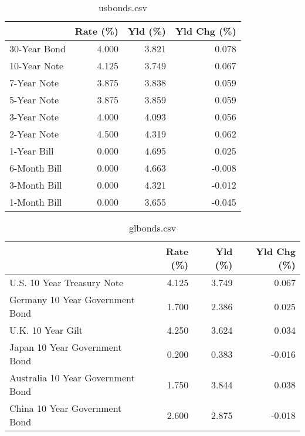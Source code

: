 \documentclass{article}%
\begin{document}
%


\begin{table}[htbp]%
\caption{usbonds.csv}%
\centering%
\begin{adjustbox}{width=1\textwidth}%
\begin{tabular}{lrrr}
\toprule
             &  Rate (\%) &  Yld (\%) &  Yld Chg (\%) \\
\midrule
30-Year Bond &     4.000 &    3.821 &        0.078 \\
10-Year Note &     4.125 &    3.749 &        0.067 \\
 7-Year Note &     3.875 &    3.838 &        0.059 \\
 5-Year Note &     3.875 &    3.859 &        0.059 \\
 3-Year Note &     4.000 &    4.093 &        0.056 \\
 2-Year Note &     4.500 &    4.319 &        0.062 \\
 1-Year Bill &     0.000 &    4.695 &        0.025 \\
6-Month Bill &     0.000 &    4.663 &       -0.008 \\
3-Month Bill &     0.000 &    4.321 &       -0.012 \\
1-Month Bill &     0.000 &    3.655 &       -0.045 \\
\bottomrule
\end{tabular}
%
\end{adjustbox}%
\end{table}

%


\begin{table}[htbp]%
\caption{glbonds.csv}%
\centering%
\begin{adjustbox}{width=1\textwidth}%
\begin{tabular}{lrrr}
\toprule
                                  &  Rate (\%) &  Yld (\%) &  Yld Chg (\%) \\
\midrule
       U.S. 10 Year Treasury Note &     4.125 &    3.749 &        0.067 \\
  Germany 10 Year Government Bond &     1.700 &    2.386 &        0.025 \\
                U.K. 10 Year Gilt &     4.250 &    3.624 &        0.034 \\
    Japan 10 Year Government Bond &     0.200 &    0.383 &       -0.016 \\
Australia 10 Year Government Bond &     1.750 &    3.844 &        0.038 \\
    China 10 Year Government Bond &     2.600 &    2.875 &       -0.018 \\
\bottomrule
\end{tabular}
%
\end{adjustbox}%
\end{table}
\end{document}

